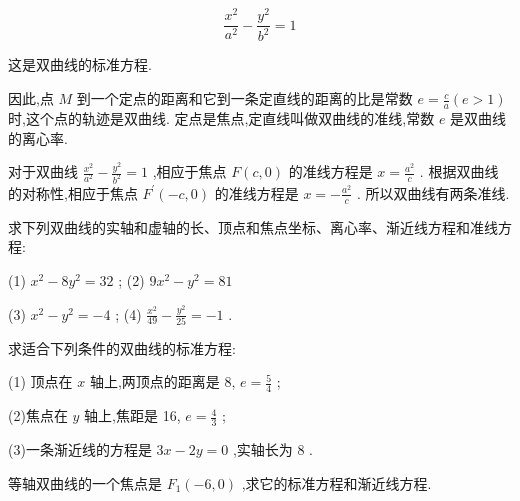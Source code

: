 \documentclass[lang=cn,newtx,10.5pt,scheme=chinese]{elegantbook}
\begin{document}
\[
  \frac{{x}^{2}}{{a}^{2}} - \frac{{y}^{2}}{{b}^{2}} = 1
\]

这是双曲线的标准方程.

因此,点 \(M\) 到一个定点的距离和它到一条定直线的距离的比是常数 \(e = \frac{c}{a}\left( {e > 1}\right)\) 时,这个点的轨迹是双曲线. 定点是焦点,定直线叫做双曲线的准线,常数 \(e\) 是双曲线的离心率.

对于双曲线 \(\frac{{x}^{2}}{{a}^{2}} - \frac{{y}^{2}}{{b}^{2}} = 1\) ,相应于焦点 \(F\left( {c,0}\right)\) 的准线方程是 \(x = \frac{{a}^{2}}{c}\) . 根据双曲线的对称性,相应于焦点 \({F}^{\prime }\left( {-c,0}\right)\) 的准线方程是 \(x = - \frac{{a}^{2}}{c}\) . 所以双曲线有两条准线.

\begin{problemset}[练习]

\item 求下列双曲线的实轴和虚轴的长、顶点和焦点坐标、离心率、渐近线方程和准线方程:

(1) \({x}^{2} - 8{y}^{2} = {32}\) ; (2) \(9{x}^{2} - {y}^{2} = {81}\)

(3) \({x}^{2} - {y}^{2} = - 4\) ; (4) \(\frac{{x}^{2}}{49} - \frac{{y}^{2}}{25} = - 1\) .

\item 求适合下列条件的双曲线的标准方程:

(1) 顶点在 \(x\) 轴上,两顶点的距离是 8, \(e = \frac{5}{4}\) ;

(2)焦点在 \(y\) 轴上,焦距是 16, \(e = \frac{4}{3}\) ;

(3)一条渐近线的方程是 \({3x} - {2y} = 0\) ,实轴长为 8 .

\item 等轴双曲线的一个焦点是 \({F}_{1}\left( {-6,0}\right)\) ,求它的标准方程和渐近线方程.

\end{problemset}
\end{document}
